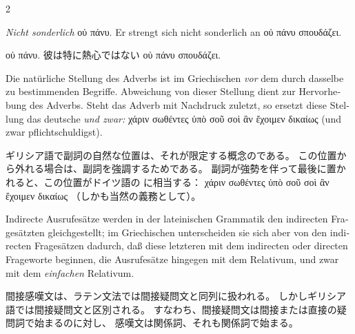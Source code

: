 \begin{paracol}{2}
\begin{enumerate}[leftmargin=0pt,rightmargin=0pt,listparindent =1cm,labelindent=1cm,labelsep=1ex,labelwidth={*},itemindent={*},align=left]
\begin{german}
\item \emph{Nicht sonderlich} \textgreek[variant=ancient]{οὐ πάνυ.} Er strengt
sich nicht sonderlich an \textgreek[variant=ancient]{οὐ πάνυ σπουδάζει.}
\end{german}
\switchcolumn

\begin{japanese}
 \textgreek[variant=ancient]{οὐ πάνυ.}
彼は特に熱心ではない \textgreek[variant=ancient]{οὐ πάνυ σπουδάζει.}
\end{japanese}
\switchcolumn*

\begin{german}
\item Die natürliche Stellung des Adverbs ist im Griechischen \emph{vor}
dem durch dasselbe zu bestimmenden Begriffe. Abweichung von dieser
Stellung dient zur Hervorhebung des Adverbs. Steht das Adverb mit
Nachdruck zuletzt, so ersetzt diese Stellung das deutsche \emph{und
zwar:} \textgreek[variant=ancient]{χάριν σωθέντες ὑπὸ σοῦ σοὶ ἂν ἔχοιμεν
δικαίως} (und zwar pflichtschuldigst). 
\end{german}
\switchcolumn

\begin{japanese}
ギリシア語で副詞の自然な位置は、それが限定する概念のである。
この位置から外れる場合は、副詞を強調するためである。
副詞が強勢を伴って最後に置かれると、この位置がドイツ語の
 に相当する：
\textgreek[variant=ancient]{χάριν σωθέντες ὑπὸ σοῦ σοὶ ἂν ἔχοιμεν δικαίως}
（しかも当然の義務として）。
\end{japanese}
\switchcolumn*

\begin{german}
\item Indirecte Ausrufesätze werden in der lateinischen Grammatik den indirecten
Fragesätzten gleichgestellt; im Griechischen unterscheiden sie sich
aber von den indirecten Fragesätzen dadurch, daß diese letzteren mit
dem indirecten oder directen Frageworte beginnen, die Ausrufesätze
hingegen mit dem Relativum, und zwar mit dem \emph{einfachen} Relativum.
\end{german}
\switchcolumn

\begin{japanese}
間接感嘆文は、ラテン文法では間接疑問文と同列に扱われる。
しかしギリシア語では間接疑問文と区別される。
すなわち、間接疑問文は間接または直接の疑問詞で始まるのに対し、
感嘆文は関係詞、それも関係詞で始まる。
\end{japanese}
\switchcolumn*


\end{enumerate}
\end{paracol}
